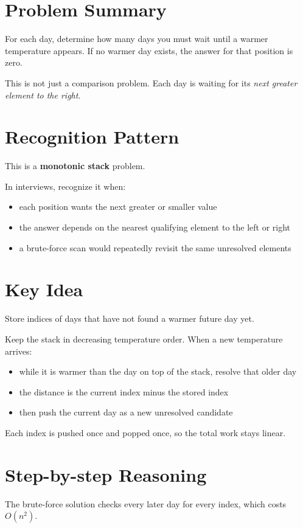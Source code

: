 \section{Problem Summary}
For each day, determine how many days you must wait until a warmer temperature appears. If no warmer day exists, the answer for that position is zero.

This is not just a comparison problem. Each day is waiting for its \emph{next greater element to the right}.

\section{Recognition Pattern}
This is a \textbf{monotonic stack} problem.

In interviews, recognize it when:
\begin{itemize}
\item each position wants the next greater or smaller value
\item the answer depends on the nearest qualifying element to the left or right
\item a brute-force scan would repeatedly revisit the same unresolved elements
\end{itemize}

\section{Key Idea}
Store indices of days that have not found a warmer future day yet.

Keep the stack in decreasing temperature order. When a new temperature arrives:
\begin{itemize}
\item while it is warmer than the day on top of the stack, resolve that older day
\item the distance is the current index minus the stored index
\item then push the current day as a new unresolved candidate
\end{itemize}

Each index is pushed once and popped once, so the total work stays linear.

\section{Step-by-step Reasoning}
The brute-force solution checks every later day for every index, which costs \(O(n^2)\).

